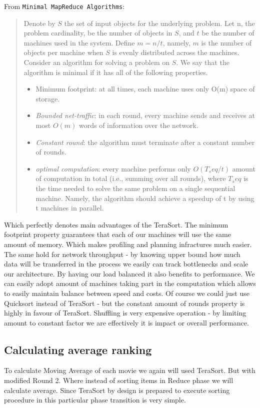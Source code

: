From \texttt{Minimal MapReduce Algorithms}:
\begin{quote}
Denote by $S$ the set of input objects 
for the underlying problem. Let n, the problem cardinality,
be the number of objects in $S$, and $t$ be the number of machines
used in the system. Define $m = n/t$, namely, $m$ is the number
of objects per machine when $S$ is evenly distributed across the
machines. Consider an algorithm for solving a problem on $S$.
We say that the algorithm is minimal if it has all of the following
properties.

\begin{itemize}
\item Minimum footprint: at all times, each machine uses only
O(m) space of storage.
\item \emph{Bounded net-traffic}: in each round, every machine sends
and receives at most $O(m)$ words of information over the
network.
\item  \emph{Constant round}: the algorithm must terminate after a
constant number of rounds.
\item \emph{optimal computation}: every machine performs only
$O(T_seq /t)$ amount of computation in total (i.e., summing
over all rounds), where $T_seq$ is the time needed to solve the
same problem on a single sequential machine. Namely, the
algorithm should achieve a speedup of t by using t machines
in parallel. 
\end{itemize}
\end{quote}


Which perfectly denotes main advantages of the TeraSort. The minimum footprint property guarantees
that each of our machines will use the same amount of memory. Which makes profiling
and planning infractures much easier. The same hold for network throughput - by knowing
upper bound how much data will be transferred in the process we easily can track bottlenecks
and scale our architecture.
By having our load balanced it also benefits to performance. We can easily adopt amount of machines
taking part in the computation which allows to easily maintain balance between speed and costs.
Of course we could just use Quicksort instead of TeraSort - but the constant amount of rounds property
is highly in favour of TeraSort. Shuffling is very expensive operation - by limiting amount to constant
factor we are effectively it is impact or overall performance.


\subsection{Calculating average ranking}
To calculate Moving Average of each movie we again will used TeraSort.
But with modified Round 2. Where instead of sorting items in Reduce phase
we will calculate average. Since TeraSort by design is prepared to execute
sorting procedure in this particular phase transition is very simple.

